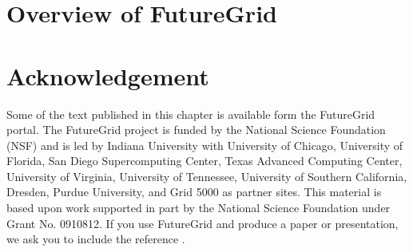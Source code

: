 \documentclass{article}
\begin{document}



\section{Overview of FutureGrid}


















\section*{Acknowledgement}

Some of the text published in this chapter is available form the
FutureGrid portal. The FutureGrid project is funded by the National
Science Foundation (NSF) and is led by Indiana University with
University of Chicago, University of Florida, San Diego Supercomputing
Center, Texas Advanced Computing Center, University of Virginia,
University of Tennessee, University of Southern California, Dresden,
Purdue University, and Grid 5000 as partner sites. This material is
based upon work supported in part by the National Science Foundation
under Grant No. 0910812. If you use FutureGrid and produce a paper or
presentation, we ask you to include the reference
\cite{las2010gce,las12fg-bookchapter}.






%
\end{document}
